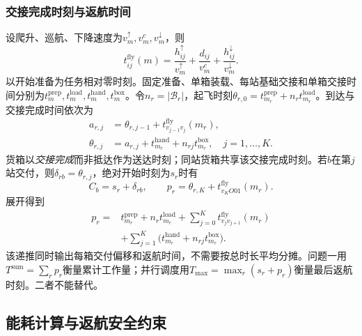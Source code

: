 \documentclass[withoutpreface,colorprint]{format}
\numberwithin{equation}{section}
\numberwithin{figure}{section}
\numberwithin{table}{section}
\begin{document}
\subsubsection{交接完成时刻与返航时间}
设爬升、巡航、下降速度为$v_m^\uparrow,v_m^c,v_m^\downarrow$，则
\begin{equation}
 t_{ij}^{\mathrm{fly}}(m)=\frac{h_{ij}^{\uparrow}}{v_m^{\uparrow}}+\frac{d_{ij}}{v_m^c}+\frac{h_{ij}^{\downarrow}}{v_m^{\downarrow}}.
\label{eq:common_leg_time}
\end{equation}
以开始准备为任务相对零时刻。固定准备、单箱装载、每站基础交接和单箱交接时间分别为$t_m^{\mathrm{prep}},t_m^{\mathrm{load}},t_m^{\mathrm{hand}},t_m^{\mathrm{box}}$。令$n_r=|\mathcal B_r|$，起飞时刻$\theta_{r,0}=t_{m_r}^{\mathrm{prep}}+n_rt_{m_r}^{\mathrm{load}}$。到达与交接完成时间依次为
\begin{equation}
\begin{aligned}
 a_{r,j}&=\theta_{r,j-1}+t_{v_{j-1}v_j}^{\mathrm{fly}}(m_r),\\
 \theta_{r,j}&=a_{r,j}+t_{m_r}^{\mathrm{hand}}+n_{rj}t_{m_r}^{\mathrm{box}},\quad j=1,\ldots,K.
\end{aligned}
\label{eq:common_delivery_recursion}
\end{equation}
货箱以\emph{交接完成}而非抵达作为送达时刻；同站货箱共享该交接完成时刻。若$b$在第$j$站交付，则$\delta_{rb}=\theta_{r,j}$，绝对开始时刻为$s_r$时有
\begin{equation}
 C_b=s_r+\delta_{rb},\qquad p_r=\theta_{r,K}+t_{v_KO01}^{\mathrm{fly}}(m_r).
\label{eq:common_delivery_return}
\end{equation}
展开得到
\begin{equation}
\begin{split}
 p_r={}&t_{m_r}^{\mathrm{prep}}+n_rt_{m_r}^{\mathrm{load}}
 +\sum_{j=0}^Kt_{v_jv_{j+1}}^{\mathrm{fly}}(m_r)\\
 &+\sum_{j=1}^K\bigl(t_{m_r}^{\mathrm{hand}}+n_{rj}t_{m_r}^{\mathrm{box}}\bigr).
\end{split}
\label{eq:common_task_duration}
\end{equation}
该递推同时输出每箱交付偏移和返航时间，不需要按总时长平均分摊。问题一用$T^{\mathrm{sum}}=\sum_rp_r$衡量累计工作量；并行调度用$T_{\max}=\max_r(s_r+p_r)$衡量最后返航时刻。二者不能替代。

\subsection{能耗计算与返航安全约束}
\end{document}
